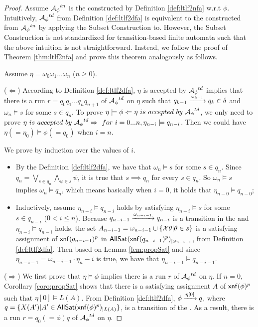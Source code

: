 \begin{proof}
Assume ${\mathcal{A}_{\phi}}^{tn}$ is the \TNFA constructed by Definition \ref{def:ltlf2nfa} w.r.t $\phi$. Intuitively, ${\mathcal{A}_{\phi}}^{td}$ from Definition \ref{def:ltlf2dfa} is equivalent to the \TDFA constructed from ${\mathcal{A}_{\phi}}^{tn}$ by applying the Subset Construction to. However, the Subset Construction is not standardized for transition-based finite automata such that the above intuition is not straightforward. Instead, we follow the proof of Theorem \ref{thm:ltlf2nfa} and prove this theorem analogously as follows.

Assume $\eta = \omega_0\omega_1\ldots\omega_n$ ($n\geq 0$). 

($\Leftarrow$) 
According to Definition \ref{def:ltlf2dfa},  $\eta$ is accepted by ${\mathcal{A}_{\phi}}^{td}$ implies that there is a run $r=q_0q_1\ldots q_n q_{n+1}$ of ${\mathcal{A}_{\phi}}^{td}$ on $\eta$ such that $q_{k-1}\xrightarrow[]{\omega_{k-1}}q_k \in \delta$ and $\omega_n\models s$ for some $s\in q_n$.
To prove $\eta\models\phi\Leftarrow\eta\ is\ accepted\ by\  {\A_{\phi}}^{td}$, we only need to prove $\eta\ is\ accepted\ by\  {\A_{\phi}}^{td}\Rightarrow\ for\ i=0...n,\eta_{n-i}\models q_{n-i}$. Then we could have $\eta (=\eta_0)\models \phi (=q_0)$ when $i=n$.

We prove by induction over the values of $i$.
\begin{itemize}
	\item By the Definition \ref{def:ltlf2dfa}, we have that $\omega_n\models s$ for some $s\in q_n$. Since $q_n = \bigvee_{s\in q_n}\bigwedge_{\psi\in s}\psi$, it is true that $s\implies q_n$ for every $s\in q_n$. So $\omega_n\models s$ implies $\omega_n\models q_n$, which means basically when $i = 0$, it holds that $\eta_{n-0}\models q_{n-0}$;
	\item Inductively, assume $\eta_{n-i}\models q_{n-i}$ holds by satisfying $\eta_{n-i}\models s$ for some $s\in q_{n-i}$ ($0<i\leq n$). Because $q_{n-i-1}\xrightarrow[]{\omega_{n-i-1}}q_{n-i}$ is a transition in the \TDFA and $\eta_{n-i}\models q_{n-i}$ holds, the set $A_{n-i-1} = \omega_{n-i-1}\cup \{\mathcal{X}\theta | \theta\in s\}$ is a satisfying assignment of ${\sf xnf}(q_{n-i-1})^p$ in ${\sf AllSat}({\sf xnf}(q_{n-i-1})^p)_{|\omega_{n-i-1}}$, from Definition \ref{def:ltlf2dfa}. Then based on Lemma \ref{lem:propSat} and since $\eta_{n-i-1}=\omega_{n-i-1}\cdot\eta_n-i$ is true, we have that $\eta_{n-i-1}\models q_{n-i-1}$.
\end{itemize}

($\Rightarrow$) We first prove that $\eta\models\phi$ implies there is a run $r$ of ${\mathcal{A}_{\phi}}^{td}$ on $\eta$. 
If $n = 0$, Corollary \ref{coro:propSat} shows that there is a satisfying assignment $A$ of ${\sf xnf}(\phi)^p$ such that $\eta[0]\models L(A)$. From Definition \ref{def:ltlf2dfa}, $\phi\xrightarrow[]{\eta[0]}q$, where $q=\{X(A') | A'\in{\sf AllSat}({\sf xnf}(\phi)^p)_{|L(A)}\}$, is a transition of the \TDFA. As a result, there is a run $r=q_0(=\phi)q$ of ${\mathcal{A}_{\phi}}^{td}$ on $\eta$.
 

\end{proof}
